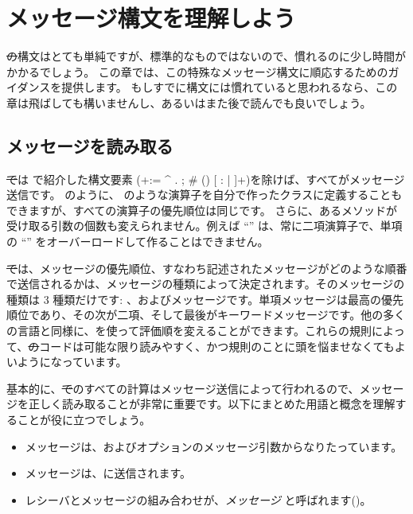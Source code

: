 \documentclass[a4paper,10pt,twoside]{book}
\begin{document}
	\renewcommand{\nnbb}[2]{} %
	\sloppy
\fi
\chapter{メッセージ構文を理解しよう}

\st の構文はとても単純ですが、標準的なものではないので、慣れるのに少し時間がかかるでしょう。
この章では、この特殊なメッセージ構文に順応するためのガイダンスを提供します。
もしすでに構文には慣れていると思われるなら、この章は飛ばしても構いませんし、あるいはまた後で読んでも良いでしょう。

\section{メッセージを読み取る}

\st では  で紹介した構文要素 (\ct+:= ^ . ; # () {} [ : | ]+)を除けば、すべてがメッセージ送信です。
 のように、\ct{+} のような演算子を自分で作ったクラスに定義することもできますが、すべての演算子の優先順位は同じです。
さらに、あるメソッドが受け取る引数の個数も変えられません。例えば ``\ct{-}'' は、常に二項演算子で、単項の ``\ct{-}'' をオーバーロードして作ることはできません。

\st では、メッセージの優先順位、すなわち記述されたメッセージがどのような順番で送信されるかは、メッセージの種類によって決定されます。そのメッセージの種類は 3 種類だけです: 、およびメッセージです。単項メッセージは最高の優先順位であり、その次が二項、そして最後がキーワードメッセージです。他の多くの言語と同様に、を使って評価順を変えることができます。これらの規則によって、\st のコードは可能な限り読みやすく、かつ規則のことに頭を悩ませなくてもよいようになっています。

基本的に、\st でのすべての計算はメッセージ送信によって行われるので、メッセージを正しく読み取ることが非常に重要です。以下にまとめた用語と概念を理解することが役に立つでしょう。

\begin{itemize}
  \item メッセージは、およびオプションのメッセージ引数からなりたっています。
  \item メッセージは、に送信されます。
  \item レシーバとメッセージの組み合わせが、\emph{メッセージ} と呼ばれます()。
\end{itemize}
\end{document}
